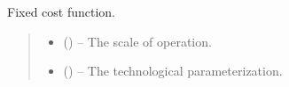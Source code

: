 \documentclass[letterpaper,10pt,english]{sphinxmanual}
\begin{document}
\begin{fulllineitems}
\label{\detokenize{technology:technology.simple_electrolysis.fixed_cost}}
\pysigstartsignatures
{}
\pysigstopsignatures
\sphinxAtStartPar
Fixed cost function.
\begin{quote}\begin{description}
\begin{itemize}
\item {} 
\sphinxAtStartPar
{} () – The scale of operation.

\item {} 
\sphinxAtStartPar
{} () – The technological parameterization.

\end{itemize}

\end{description}\end{quote}

\end{fulllineitems}

\end{document}
